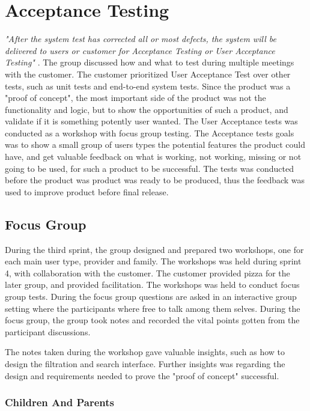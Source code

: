 \section{Acceptance Testing}
\textit{"After the system test has corrected all or most defects, the system will be delivered to users or customer for Acceptance Testing or User Acceptance Testing"} \cite{acceptanceTestingDefinition}.
The group discussed how and what to test during multiple meetings with the customer. The customer prioritized User Acceptance Test over other tests, such as unit tests and end-to-end system tests. Since the product was a "proof of concept", the most important side of the product was not the functionality and logic, but to show the opportunities of such a product, and validate if it is something potently user wanted. The User Acceptance tests was conducted as a workshop with focus group testing. The Acceptance tests goals was to show a small group of users types the potential features the product could have, and get valuable feedback on what is working, not working, missing or not going to be used, for such a product to be successful. The tests was conducted before the product was product was ready to be produced, thus the feedback was used to improve product before final release.

\subsection{Focus Group}
During the third sprint, the group designed and prepared two workshops, one for each main user type, provider and family. The workshops was held during sprint 4, with collaboration with the customer. The customer provided pizza for the later group, and provided facilitation. The workshops was held to conduct focus group tests. During the focus group questions are asked in an interactive group setting where the participants where free to talk among them selves. During the focus group, the group took notes and recorded the vital points gotten from the participant discussions.

The notes taken during the workshop gave valuable insights, such as how to design the filtration and search interface. Further insights was regarding the design and requirements needed to prove the "proof of concept" successful. 

\subsubsection{Children And Parents}

